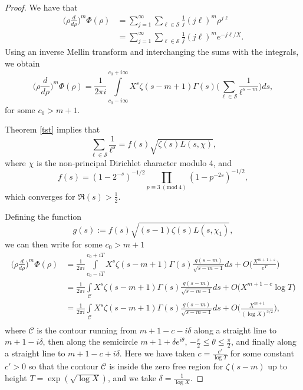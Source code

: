 \documentclass[12pt,reqno]{amsart}
\newcommand{\Mod}[1]{\ (\mathrm{mod}\ #1)}
\begin{document}
\begin{proof}
We have that
\begin{align*}
    \Big(\rho \frac{d}{d\rho}\Big)^m\Phi(\rho)&=\sum_{j=1}^\infty \sum_{\ell\in \mathcal{S}} \frac{1}{j} (j\ell)^m \rho^{j\ell}\\
    & =\sum_{j=1}^\infty \sum_{\ell\in \mathcal{S}} \frac{1}{j} (j\ell)^m e^{-j\ell/X}.
\end{align*}
   Using an inverse Mellin transform and interchanging the sums with the integrals, we obtain
\begin{equation*}
     \Big(\rho \frac{d}{d\rho}\Big)^m\Phi(\rho) = \frac{1}{2\pi i} \int\limits_{c_0-i\infty}^{c_0+i\infty} X^s\zeta(s-m+1)\Gamma(s)\Bigg(\sum_{\ell \in \mathcal{S}} \frac{1}{\ell^{s-m}}\Bigg) ds,
\end{equation*}
for some $c_0>m+1$.

      Theorem \ref{tst} implies that 
    \begin{equation*}
        \sum_{\ell\in \mathcal{S}} \frac{1}{\ell^s}= f(s)\sqrt{\zeta(s)L(s,\chi)},
    \end{equation*}
    where $\chi$ is the non-principal Dirichlet character modulo 4, and 
    \begin{equation*}
        f(s)=(1-2^{-s})^{-1/2}\prod_{p \equiv 3 \Mod 4} (1-p^{-2s})^{-1/2},
    \end{equation*}
which converges for $\Re( s)>\frac{1}{2}$.

Defining the  function $$g(s):=f(s)\sqrt{(s-1)\zeta(s)L(s,\chi_1)},$$  we can then write for some $c_0>m+1$ 
\begin{align*}
    \Big(\rho \frac{d}{d\rho}\Big)^m\Phi(\rho) & =  \frac{1}{2\pi i} \int\limits_{c_0-iT}^{c_0+iT} X^s\zeta(s-m+1)\Gamma(s) \frac{g(s-m)}{\sqrt{s-m-1}} ds+O\Big(\frac{X^{m+1+\varepsilon}}{e^T}\Big)  \quad  \\ %
    & =  \frac{1}{2\pi i} \int\limits_{\mathcal{C}} X^s\zeta(s-m+1)\Gamma(s) \frac{g(s-m)}{\sqrt{s-m-1}} ds+O\Big(X^{m+1-c}\log T\Big)  \\
    & =  \frac{1}{2\pi i} \int\limits_{\mathcal{C}} X^s\zeta(s-m+1)\Gamma(s) \frac{g(s-m)}{\sqrt{s-m-1}} ds+O\Bigg(\frac{X^{m+1}}{(\log X)^{3/2}}\Bigg), \\
\end{align*}
where $\mathcal{C}$ is the contour running from $m+1-c-i\delta$ along a straight line to $m+1-i\delta$, then along the semicircle $m+1+\delta e^{i\theta}$, $-\frac{\pi}{2}\leq \theta \leq \frac{\pi}{2}$, and finally along a straight line to $m+1-c+i\delta$. Here we have taken  $c= \frac{c'}{\log T}$ for some constant $c'>0$ so that the contour $\mathcal{C}$ is inside the zero free region for $\zeta(s-m)$ up to height $T=\exp(\sqrt{\log X})$, and we take $\delta= \frac{1}{\log X}$. 


\end{proof}
\end{document}
